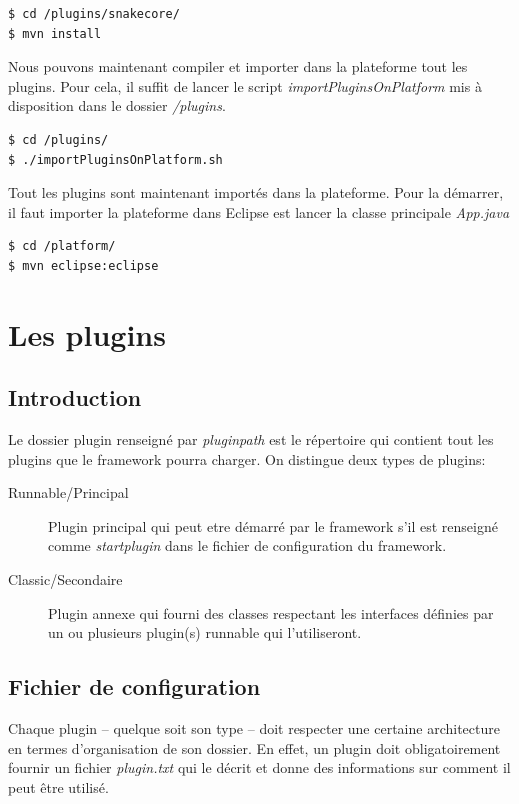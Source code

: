 \documentclass[12pt,a4paper]{article}
\begin{document}
\begin{lstlisting}[language=bash,caption=Installation des plugins principaux]
$ cd /plugins/snakecore/
$ mvn install
\end{lstlisting}

Nous pouvons maintenant compiler et importer dans la plateforme tout les plugins. 
Pour cela, il suffit de lancer le script \emph{importPluginsOnPlatform} mis à 
disposition dans le dossier \emph{/plugins}.

\begin{lstlisting}[language=bash,caption=Importer les plugins]
$ cd /plugins/
$ ./importPluginsOnPlatform.sh
\end{lstlisting}

Tout les plugins sont maintenant importés dans la plateforme. Pour la démarrer, il 
faut importer la plateforme dans Eclipse est lancer la classe principale \emph{App.java}

\begin{lstlisting}[language=bash,caption=Démarrer la plateforme]
$ cd /platform/
$ mvn eclipse:eclipse
\end{lstlisting}

\section{Les plugins}
\subsection{Introduction}
Le dossier plugin renseigné par \emph{pluginpath} est le répertoire qui contient 
tout les plugins que le framework pourra charger. On distingue deux types de 
plugins:

\begin{description}
	\item[Runnable/Principal] Plugin principal qui peut etre démarré par le framework s'il 
	est renseigné comme \emph{startplugin} dans le fichier de configuration du 
	framework.
	
	\item[Classic/Secondaire] Plugin annexe qui fourni des classes respectant les interfaces 
	définies par un ou plusieurs plugin(s) runnable qui l'utiliseront.
\end{description}

\subsection{Fichier de configuration}
Chaque plugin -- quelque soit son type -- doit respecter une certaine architecture 
en termes d'organisation de son dossier. En effet, un plugin doit obligatoirement 
fournir un fichier \emph{plugin.txt} qui le décrit et donne des informations sur 
comment il peut être utilisé.
\end{document}
